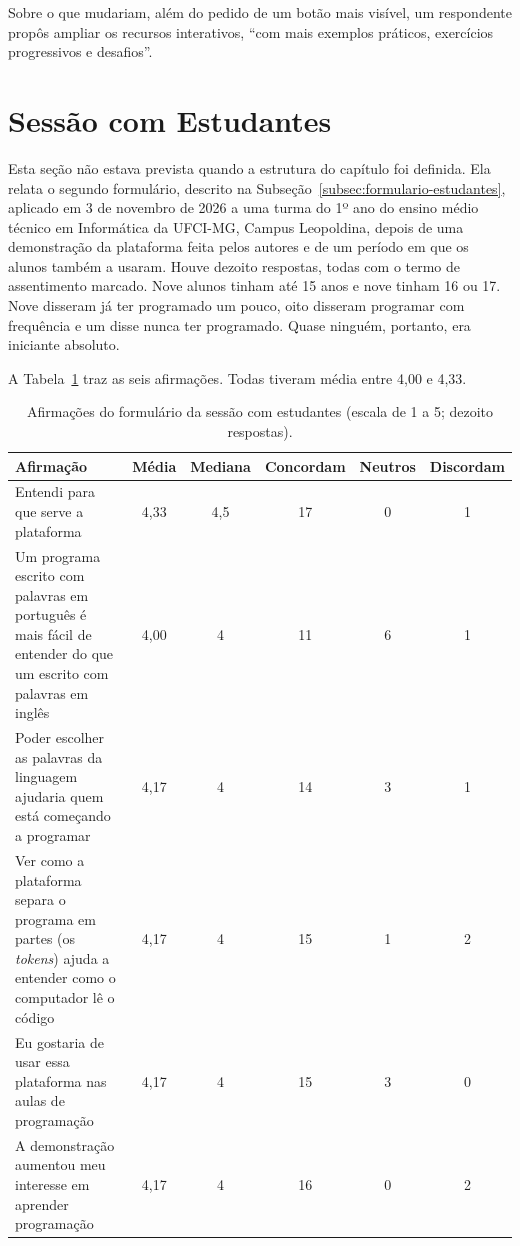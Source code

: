 Sobre o que mudariam, além do pedido de um botão mais visível, um respondente propôs ampliar os recursos interativos, ``com mais exemplos práticos, exercícios progressivos e desafios''.

\section{Sessão com Estudantes}
\label{sec:resultado-estudantes}

Esta seção não estava prevista quando a estrutura do capítulo foi definida. Ela relata o segundo formulário, descrito na Subseção~\ref{subsec:formulario-estudantes}, aplicado em 3 de novembro de 2026 a uma turma do 1º ano do ensino médio técnico em Informática da UFCI-MG, Campus Leopoldina, depois de uma demonstração da plataforma feita pelos autores e de um período em que os alunos também a usaram. Houve dezoito respostas, todas com o termo de assentimento marcado. Nove alunos tinham até 15 anos e nove tinham 16 ou 17. Nove disseram já ter programado um pouco, oito disseram programar com frequência e um disse nunca ter programado. Quase ninguém, portanto, era iniciante absoluto.

A Tabela~\ref{tab:resultado-estudantes} traz as seis afirmações. Todas tiveram média entre 4,00 e 4,33.

\begin{table}[htbp]
\centering
\caption{Afirmações do formulário da sessão com estudantes (escala de 1 a 5; dezoito respostas).}
\label{tab:resultado-estudantes}
\footnotesize
\renewcommand{\arraystretch}{1.2}
\begin{tabular}{|p{6.3cm}|c|c|c|c|c|}
\hline
\textbf{Afirmação} & \textbf{Média} & \textbf{Mediana} & \textbf{Concordam} & \textbf{Neutros} & \textbf{Discordam} \\\hline
Entendi para que serve a plataforma & 4,33 & 4,5 & 17 & 0 & 1 \\\hline
Um programa escrito com palavras em português é mais fácil de entender do que um escrito com palavras em inglês & 4,00 & 4 & 11 & 6 & 1 \\\hline
Poder escolher as palavras da linguagem ajudaria quem está começando a programar & 4,17 & 4 & 14 & 3 & 1 \\\hline
Ver como a plataforma separa o programa em partes (os \textit{tokens}) ajuda a entender como o computador lê o código & 4,17 & 4 & 15 & 1 & 2 \\\hline
Eu gostaria de usar essa plataforma nas aulas de programação & 4,17 & 4 & 15 & 3 & 0 \\\hline
A demonstração aumentou meu interesse em aprender programação & 4,17 & 4 & 16 & 0 & 2 \\\hline
\end{tabular}
\end{table}


